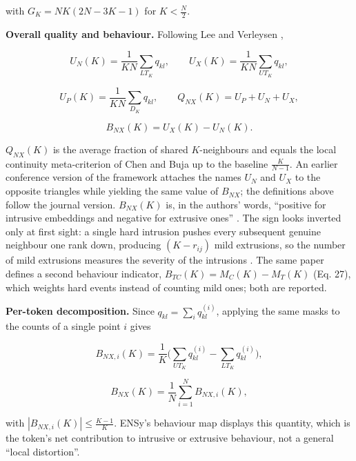 \documentclass[conference,a4paper]{IEEEtran}
\begin{document}
with \(G_K = NK(2N-3K-1)\) for \(K < \frac{N}{2}\).

\textbf{Overall quality and behaviour.} Following Lee and Verleysen
\cite[Eqs. 22–25]{r1},

\begin{equation}
U_N(K) = \frac{1}{KN}\sum_{LT_K} q_{kl},\qquad U_X(K) = \frac{1}{KN}\sum_{UT_K} q_{kl},
\end{equation}

\begin{equation}
U_P(K) = \frac{1}{KN}\sum_{D_K} q_{kl},\qquad Q_{NX}(K) = U_P + U_N + U_X,
\end{equation}

\begin{equation}
B_{NX}(K) = U_X(K) - U_N(K).
\end{equation}

\(Q_{NX}(K)\) is the average fraction of shared \(K\)-neighbours and
equals the local continuity meta-criterion of Chen and Buja \cite{r12}
up to the baseline \(\frac{K}{N-1}\). An earlier conference version of
the framework \cite{r13} attaches the names \(U_N\) and \(U_X\) to the
opposite triangles while yielding the same value of \(B_{NX}\); the
definitions above follow the journal version. \(B_{NX}(K)\) is, in the
authors' words, ``positive for intrusive embeddings and negative for
extrusive ones'' \cite[p. 1434]{r1}. The sign looks inverted only at
first sight: a single hard intrusion pushes every subsequent genuine
neighbour one rank down, producing \((K - r_{ij})\) mild extrusions, so
the number of mild extrusions measures the severity of the intrusions
\cite[Fig. 2]{r1}. The same paper defines a second behaviour indicator,
\(B_{TC}(K) = M_C(K) - M_T(K)\) (Eq. 27), which weights hard events
instead of counting mild ones; both are reported.

\textbf{Per-token decomposition.} Since
\(q_{kl} = \sum_i q_{kl}^{(i)}\), applying the same masks to the counts
of a single point \(i\) gives

\begin{equation}
B_{NX,i}(K) = \frac{1}{K}\Big(\sum_{UT_K} q_{kl}^{(i)} - \sum_{LT_K} q_{kl}^{(i)}\Big),
\end{equation}

\begin{equation}
B_{NX}(K) = \frac{1}{N}\sum_{i=1}^{N} B_{NX,i}(K),
\end{equation}

with \(|B_{NX,i}(K)| \le \frac{K-1}{K}\). ENSy's behaviour map displays
this quantity, which is the token's net contribution to intrusive or
extrusive behaviour, not a general ``local distortion''.
\end{document}
